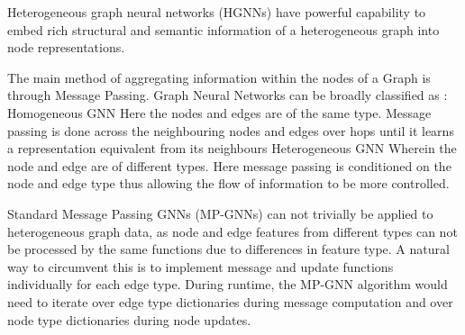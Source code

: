 \documentclass{report} %
\begin{document}


Heterogeneous graph neural networks (HGNNs) have powerful capability to embed rich structural and semantic information of a heterogeneous graph into node representations. \cite{02}


The main method of aggregating information within the nodes of a Graph is through Message Passing.
Graph Neural Networks can be broadly classified as :
Homogeneous GNN
Here the nodes and edges are of the same type. Message passing is done across the neighbouring nodes and edges over hops until it learns a representation equivalent from its neighbours
Heterogeneous GNN
Wherein the node and edge are of different types. Here message passing is conditioned on the node and edge type thus allowing the flow of information to be more controlled.

Standard Message Passing GNNs (MP-GNNs) can not trivially be applied to heterogeneous graph data, as node and edge features from different types can not be processed by the same functions due to differences in feature type. 
A natural way to circumvent this is to implement message and update functions individually for each edge type. 
During runtime, the MP-GNN algorithm would need to iterate over edge type dictionaries during message computation and over node type dictionaries during node updates.
\end{document}
